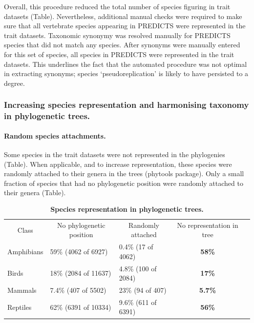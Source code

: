 Overall, this procedure reduced the total number of species figuring in trait datasets (Table). Nevertheless, additional manual checks were required to make sure that all vertebrate species appearing in PREDICTS were represented in the trait datasets. Taxonomic synonymy was resolved manually for PREDICTS species that did not match any species. After synonyms were manually entered for this set of species, all species in PREDICTS were represented in the trait datasets. This underlines the fact that the automated procedure was not optimal in extracting synonyms; species `pseudoreplication' is likely to have persisted to a degree. 



\subsubsection{Increasing species representation and harmonising taxonomy in phylogenetic trees.}

\paragraph{Random species attachments.} Some species in the trait datasets were not represented in the phylogenies (Table). When applicable, and to increase representation, these species were randomly attached to their genera in the trees (phytools package). Only a small fraction of species that had no phylogenetic position were randomly attached to their genera (Table).

\begin{table}[h!]
\renewcommand{\baselinestretch}{1}
\renewcommand{\arraystretch}{1.5}
\begin{center}\fontsize{9}{11}\selectfont
\caption[Species representation in phylogenetic trees]{\textbf{Species representation in phylogenetic trees.}} 
\label{random_attachments_phy}
\begin{tabular}{|l|l|l|c|l}
\cline{1-4}
\multicolumn{1}{|c|}{Class} & \multicolumn{1}{c|}{No phylogenetic position} & \multicolumn{1}{c|}{Randomly attached} & No representation in tree &  \\ \cline{1-4}
Amphibians                  & 59\% (4062 of 6927)                           & 0.4\% (17 of 4062)                     & \textbf{58\%}             &  \\ \cline{1-4}
Birds                       & 18\% (2084 of 11637)                          & 4.8\% (100 of 2084)                    & \textbf{17\%}             &  \\ \cline{1-4}
Mammals                     & 7.4\% (407 of 5502)                           & 23\% (94 of 407)                       & \textbf{5.7\%}            &  \\ \cline{1-4}
Reptiles                    & 62\% (6391 of 10334)                          & 9.6\% (611 of 6391)                    & \textbf{56\%}             &  \\ \cline{1-4}
\end{tabular}
\end{center}
\end{table}

